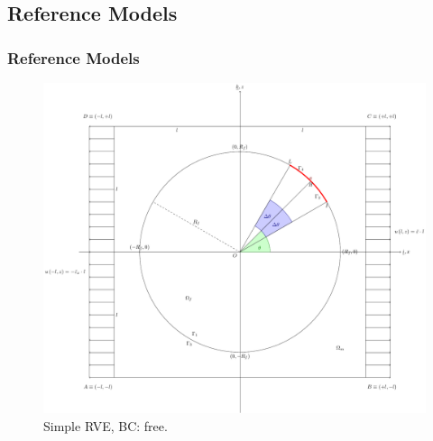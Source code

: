 \documentclass[first,firstsupp,lastsupp,handout,last,hyperref,table]{ETHclass}
\begin{document}
\subsection{Reference Models}

\begin{frame}
\frametitle{\small Reference Models}
\vspace{-0.25cm}
\centering
\begin{figure}
\centering
\includegraphics[height=0.7\textheight]{LEFM2DsRVEsFsDfreeBCULappAxialDispLR.pdf}
\caption{\scriptsize Simple RVE, BC: free.}
\label{fig:singleRVE-rigid}
\end{figure}
\end{frame}
\end{document}
